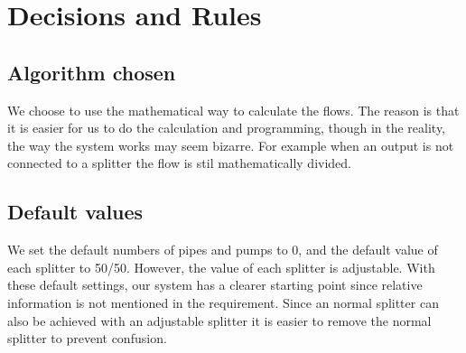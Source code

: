 \chapter{Decisions and Rules}
\section{Algorithm chosen}
\label{sec:algch}	
We choose to use the mathematical way to calculate the flows. The reason is that it is easier for us to do the calculation and programming, though in the reality, the way the system works may seem bizarre. For example when an output is not connected to a splitter the flow is stil mathematically divided.

\section{Default values}
\label{sec:defv}
We set the default numbers of pipes and pumps to 0, and the default value of each splitter to 50/50. However, the value of each splitter is adjustable. With these default settings, our system has a clearer starting point since relative information is not mentioned in the requirement. Since an normal splitter can also be achieved with an adjustable splitter it is easier to remove the normal splitter to prevent confusion.
